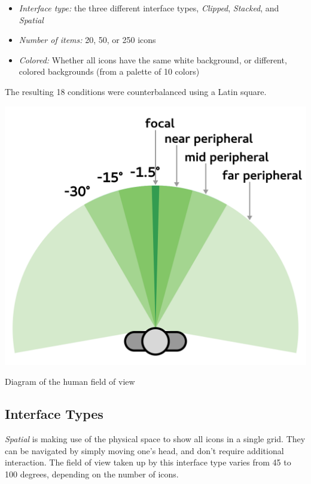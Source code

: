 \documentclass{tufte-book} %
\begin{document}
\begin{itemize}
  \item \emph{Interface type:} the three different interface types, \emph{Clipped}, \emph{Stacked}, and \emph{Spatial}
  \item \emph{Number of items:} 20, 50, or 250 icons
  \item \emph{Colored:} Whether all icons have the same white background, or different, colored backgrounds (from a palette of 10 colors)
\end{itemize}

The resulting 18 conditions were counterbalanced using a Latin square.

\begin{marginfigure}
  \includegraphics[width=\linewidth]{visual-field.png}
  \caption{Diagram of the human field of view}
  \label{fig:visual-field}
\end{marginfigure}

\subsection{Interface Types}

\emph{Spatial} is making use of the physical space to show all icons in a single grid. They can be navigated by simply moving one's head, and don't require additional interaction. The field of view taken up by this interface type varies from 45 to 100 degrees, depending on the number of icons.
\end{document}
